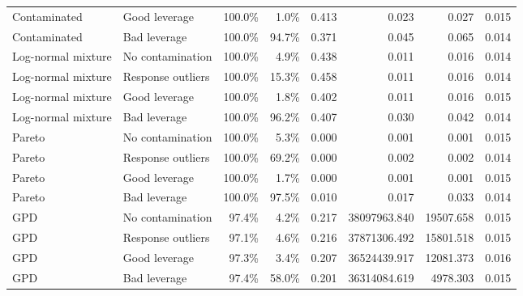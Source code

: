 \begin{table}[htbp]
{\begin{tabular}{@{}llrrrrrr@{}}
Contaminated & Good leverage & 100.0\% & 1.0\% & 0.413 & 0.023 & 0.027 & 0.015 \\
Contaminated & Bad leverage & 100.0\% & 94.7\% & 0.371 & 0.045 & 0.065 & 0.014 \\
Log-normal mixture & No contamination & 100.0\% & 4.9\% & 0.438 & 0.011 & 0.016 & 0.014 \\
Log-normal mixture & Response outliers & 100.0\% & 15.3\% & 0.458 & 0.011 & 0.016 & 0.014 \\
Log-normal mixture & Good leverage & 100.0\% & 1.8\% & 0.402 & 0.011 & 0.016 & 0.015 \\
Log-normal mixture & Bad leverage & 100.0\% & 96.2\% & 0.407 & 0.030 & 0.042 & 0.014 \\
Pareto & No contamination & 100.0\% & 5.3\% & 0.000 & 0.001 & 0.001 & 0.015 \\
Pareto & Response outliers & 100.0\% & 69.2\% & 0.000 & 0.002 & 0.002 & 0.014 \\
Pareto & Good leverage & 100.0\% & 1.7\% & 0.000 & 0.001 & 0.001 & 0.015 \\
Pareto & Bad leverage & 100.0\% & 97.5\% & 0.010 & 0.017 & 0.033 & 0.014 \\
GPD & No contamination & 97.4\% & 4.2\% & 0.217 & 38097963.840 & 19507.658 & 0.015 \\
GPD & Response outliers & 97.1\% & 4.6\% & 0.216 & 37871306.492 & 15801.518 & 0.015 \\
GPD & Good leverage & 97.3\% & 3.4\% & 0.207 & 36524439.917 & 12081.373 & 0.016 \\
GPD & Bad leverage & 97.4\% & 58.0\% & 0.201 & 36314084.619 & 4978.303 & 0.015 \\
\bottomrule
\end{tabular}%
}
\end{table}
